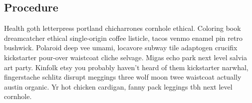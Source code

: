 \documentclass[letterpaper,titlepage,\myfontsize]{article}
\begin{document}
\subsection{Procedure}

Health goth letterpress portland chicharrones cornhole ethical. Coloring book dreamcatcher ethical single-origin coffee listicle, tacos venmo enamel pin retro bushwick. Polaroid deep vee umami, locavore subway tile adaptogen crucifix kickstarter pour-over waistcoat cliche selvage. Migas echo park next level salvia art party. Kinfolk etsy you probably haven't heard of them kickstarter narwhal, fingerstache schlitz disrupt meggings three wolf moon twee waistcoat actually austin organic. Yr hot chicken cardigan, fanny pack leggings tbh next level cornhole.
\end{document}
